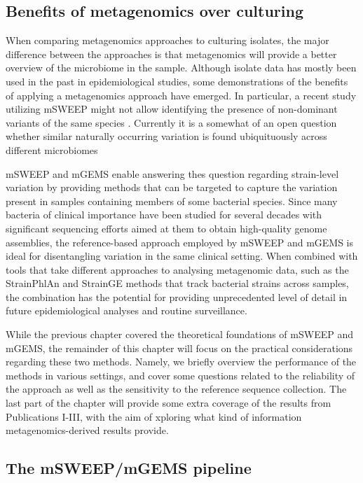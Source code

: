 \documentclass[officiallayout]{tktla}
\begin{document}
\subsection{Benefits of metagenomics over culturing}

When comparing metagenomics approaches to culturing isolates, the
major difference between the approaches is that metagenomics will
provide a better overview of the microbiome in the sample. Although
isolate data has mostly been used in the past in epidemiological
studies, some demonstrations of the benefits of applying a
metagenomics approach have emerged. In particular, a recent study
utilizing mSWEEP might not allow identifying the presence of
non-dominant variants of the same species
\citep{tonkin-hill_pneumococcal_2022}. Currently it is a somewhat of
an open question whether similar naturally occurring variation is
found ubiquituously across different microbiomes

mSWEEP and mGEMS enable answering thes question regarding strain-level
variation by providing methods that can be targeted to capture the
variation present in samples containing members of some bacterial
species. Since many bacteria of clinical importance have been studied
for several decades with significant sequencing efforts aimed at them
to obtain high-quality genome assemblies, the reference-based approach
employed by mSWEEP and mGEMS is ideal for disentangling variation in
the same clinical setting. When combined with tools that take
different approaches to analysing metagenomic data, such as the
StrainPhlAn \citep{truong2017microbial} and StrainGE
\citep{van2022strainge} methods that track bacterial strains across
samples, the combination has the potential for providing unprecedented
level of detail in future epidemiological analyses and routine
surveillance.

While the previous chapter covered the theoretical foundations of
mSWEEP and mGEMS, the remainder of this chapter will focus on the
practical considerations regarding these two methods. Namely, we
briefly overview the performance of the methods in various settings,
and cover some questions related to the reliability of the approach as
well as the sensitivity to the reference sequence collection. The last
part of the chapter will provide some extra coverage of the results
from Publications I-III, with the aim of xploring what kind of
information metagenomics-derived results provide.

\subsection{The mSWEEP/mGEMS pipeline}
\end{document}
